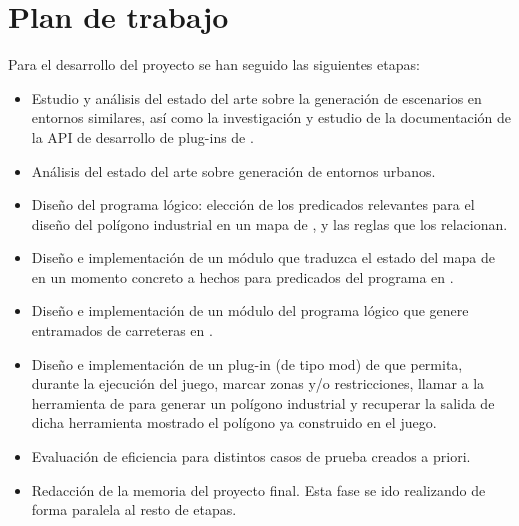 \section{Plan de trabajo}

Para el desarrollo del proyecto se han seguido las siguientes etapas:

\begin{itemize}
	\item Estudio y análisis del estado del arte sobre la generación de escenarios en entornos similares, así como la investigación y estudio de la documentación de la API de desarrollo de plug-ins de \cities. 
	\item Análisis del estado del arte sobre generación de entornos urbanos.
	\item Diseño del programa lógico: elección de los predicados relevantes para el diseño del polígono industrial en un mapa de \cities, y las reglas que los relacionan.
	\item Diseño e implementación de un módulo que traduzca el estado del mapa de \cities en un momento concreto a hechos para predicados del programa en \asp.
	\item Diseño e implementación de un módulo del programa lógico que genere entramados de carreteras en \asp.
	\item Diseño e implementación de un plug-in (de tipo mod) de \cities que permita, durante la ejecución del juego, marcar zonas y/o restricciones, llamar a la herramienta de \asp para generar un polígono industrial y recuperar la salida de dicha herramienta mostrado el polígono ya construido en el juego.
	\item Evaluación de eficiencia para distintos casos de prueba creados a priori.
	\item Redacción de la memoria del proyecto final. Esta fase se ido realizando de forma paralela al resto de etapas.
\end{itemize}